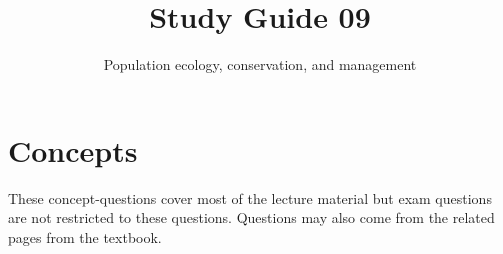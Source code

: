 \documentclass[nofonts, letterpaper]{tufte-handout}
\title{Study Guide 09}
\author{Population ecology, conservation, and management}
\date{} %
\begin{document}
\maketitle	%


\section{Concepts}

These concept-questions cover most of the lecture material but exam questions are not restricted to these questions. Questions may also come from the related pages from the textbook.\vspace{\baselineskip}
\end{document}
